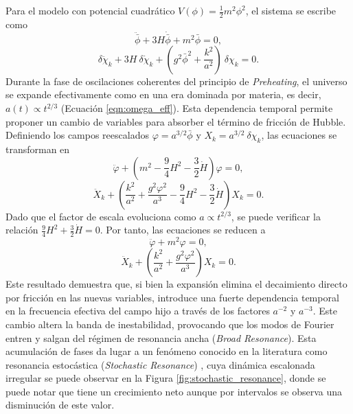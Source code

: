 Para el modelo con potencial cuadrático $V(\phi) = \frac{1}{2} m^2 \phi^2$, el sistema se escribe como
\begin{equation}
    \ddot{\bar{\phi}} + 3 H \dot{\bar{\phi}} + m^2 \bar{\phi} = 0,
\end{equation}
\begin{equation}
    \delta \ddot{\chi}_k + 3 H ~ \delta \dot{\chi}_k + \left( g^2 \bar{\phi}^2 + \frac{k^2}{a^2} \right) ~ \delta \chi_k = 0. 
\end{equation}
Durante la fase de oscilaciones coherentes del principio de \textit{Preheating}, el universo se expande efectivamente como en una era dominada por materia, es decir, $a(t) \propto t^{2/3}$ (Ecuación \ref{eqn:omega_eff}). Esta dependencia temporal permite proponer un cambio de variables para absorber el término de fricción de Hubble. Definiendo los campos reescalados $\varphi = a^{3/2} \bar{\phi}$ y $X_k = a^{3/2} ~ \delta \chi_k$, las ecuaciones se transforman en
\begin{equation}
    \ddot{\varphi} + \left( m^2 - \frac{9}{4} H^2 - \frac{3}{2} \dot{H} \right) \varphi = 0,
\end{equation}
\begin{equation}
    \ddot{X}_k + \left( \frac{k^2}{a^2} + \frac{g^2 \varphi^2}{a^3} - \frac{9}{4} H^2 - \frac{3}{2} \dot{H} \right) X_k = 0.
\end{equation}
Dado que el factor de escala evoluciona como $a \propto t^{2/3}$, se puede verificar la relación $\displaystyle \frac{9}{4} H^2 + \frac{3}{2} \dot{H} = 0$. Por tanto, las ecuaciones se reducen a
\begin{equation}
    \ddot{\varphi} + m^2 \varphi = 0,
\end{equation}
\begin{equation}
    \ddot{X}_k + \left( \frac{k^2}{a^2} + \frac{g^2 \varphi^2}{a^3} \right) X_k = 0.
\end{equation}
Este resultado demuestra que, si bien la expansión elimina el decaimiento directo por fricción en las nuevas variables, introduce una fuerte dependencia temporal en la frecuencia efectiva del campo hijo a través de los factores $a^{-2}$ y $a^{-3}$. Este cambio altera la banda de inestabilidad, provocando que los modos de Fourier entren y salgan del régimen de resonancia ancha (\textit{Broad Resonance}). Esta acumulación de fases da lugar a un fenómeno conocido en la literatura como resonancia estocástica (\textit{Stochastic Resonance}) \cite{Amin_2014, Kofman_1997}, cuya dinámica escalonada irregular se puede observar en la Figura \ref{fig:stochastic_resonance}, donde se puede notar que tiene un crecimiento neto aunque por intervalos se observa una disminución de este valor.

